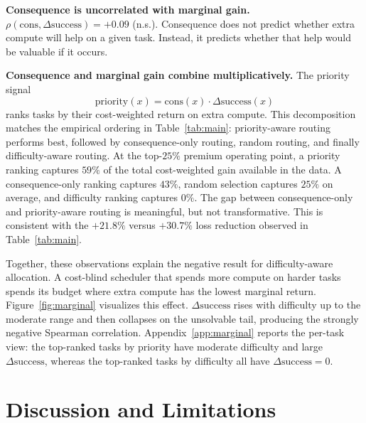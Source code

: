 \documentclass{article}
\begin{document}
\textbf{Consequence is uncorrelated with marginal gain.}
\(\rho(\mathrm{cons}, \Delta\mathrm{success}) = +0.09\) (n.s.).
Consequence does not predict whether extra compute will help on a
given task. Instead, it predicts whether that help would be valuable
if it occurs.

\textbf{Consequence and marginal gain combine multiplicatively.}
The priority signal
\[
\mathrm{priority}(x)
=
\mathrm{cons}(x)\cdot\Delta\mathrm{success}(x)
\]
ranks tasks by their cost-weighted return on extra compute. This
decomposition matches the empirical ordering in Table~\ref{tab:main}:
priority-aware routing performs best, followed by consequence-only
routing, random routing, and finally difficulty-aware routing. At the
top-$25\%$ premium operating point, a priority ranking captures
$59\%$ of the total cost-weighted gain available in the data. A
consequence-only ranking captures $43\%$, random selection captures
$25\%$ on average, and difficulty ranking captures $0\%$. The gap between
consequence-only and priority-aware routing is meaningful, but not
transformative. This is consistent with the $+21.8\%$ versus
$+30.7\%$ loss reduction observed in Table~\ref{tab:main}.

Together, these observations explain the negative result for
difficulty-aware allocation. A cost-blind scheduler that spends more
compute on harder tasks spends its budget where extra compute has the
lowest marginal return. Figure~\ref{fig:marginal} visualizes this
effect. $\Delta\mathrm{success}$ rises with difficulty up to the
moderate range and then collapses on the unsolvable tail, producing the strongly negative Spearman correlation. Appendix~\ref{app:marginal} reports the per-task view: the top-ranked tasks by priority have moderate difficulty and large $\Delta\mathrm{success}$, whereas the
top-ranked tasks by difficulty all have $\Delta\mathrm{success}=0$.

\section{Discussion and Limitations}
\label{sec:discussion}
\end{document}
